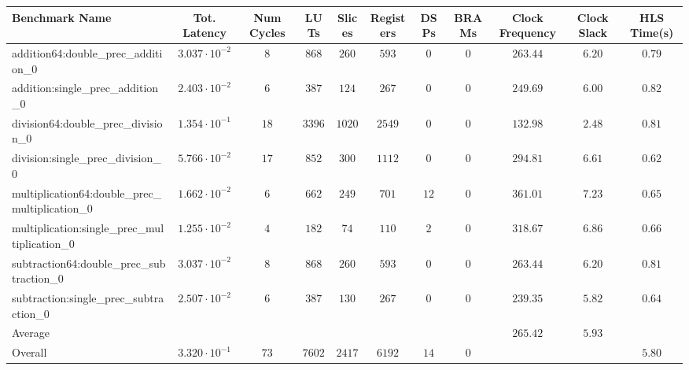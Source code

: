 \begin{tabular}{|l|c|c|c|c|c|c|c|c|c|c|}
\hline
Benchmark Name                                   & Tot. Latency            & Num Cycles & LUTs     & Slices   & Registers & DSPs   & BRAMs & Clock Frequency & Clock Slack & HLS Time(s) \\
\hline
addition64:double\_prec\_addition\_0             & $ 3.037 \cdot 10^{-2} $ & $ 8      $ & $ 868  $ & $ 260  $ & $ 593   $ & $ 0  $ & $ 0 $ & $ 263.44      $ & $ 6.20    $ & $ 0.79    $ \\
addition:single\_prec\_addition\_0               & $ 2.403 \cdot 10^{-2} $ & $ 6      $ & $ 387  $ & $ 124  $ & $ 267   $ & $ 0  $ & $ 0 $ & $ 249.69      $ & $ 6.00    $ & $ 0.82    $ \\
division64:double\_prec\_division\_0             & $ 1.354 \cdot 10^{-1} $ & $ 18     $ & $ 3396 $ & $ 1020 $ & $ 2549  $ & $ 0  $ & $ 0 $ & $ 132.98      $ & $ 2.48    $ & $ 0.81    $ \\
division:single\_prec\_division\_0               & $ 5.766 \cdot 10^{-2} $ & $ 17     $ & $ 852  $ & $ 300  $ & $ 1112  $ & $ 0  $ & $ 0 $ & $ 294.81      $ & $ 6.61    $ & $ 0.62    $ \\
multiplication64:double\_prec\_multiplication\_0 & $ 1.662 \cdot 10^{-2} $ & $ 6      $ & $ 662  $ & $ 249  $ & $ 701   $ & $ 12 $ & $ 0 $ & $ 361.01      $ & $ 7.23    $ & $ 0.65    $ \\
multiplication:single\_prec\_multiplication\_0   & $ 1.255 \cdot 10^{-2} $ & $ 4      $ & $ 182  $ & $ 74   $ & $ 110   $ & $ 2  $ & $ 0 $ & $ 318.67      $ & $ 6.86    $ & $ 0.66    $ \\
subtraction64:double\_prec\_subtraction\_0       & $ 3.037 \cdot 10^{-2} $ & $ 8      $ & $ 868  $ & $ 260  $ & $ 593   $ & $ 0  $ & $ 0 $ & $ 263.44      $ & $ 6.20    $ & $ 0.81    $ \\
subtraction:single\_prec\_subtraction\_0         & $ 2.507 \cdot 10^{-2} $ & $ 6      $ & $ 387  $ & $ 130  $ & $ 267   $ & $ 0  $ & $ 0 $ & $ 239.35      $ & $ 5.82    $ & $ 0.64    $ \\
\hline
Average                                          & $                     $ & $        $ & $      $ & $      $ & $       $ & $    $ & $   $ & $ 265.42      $ & $ 5.93    $ & $         $ \\
\hline
Overall                                          & $ 3.320 \cdot 10^{-1} $ & $ 73     $ & $ 7602 $ & $ 2417 $ & $ 6192  $ & $ 14 $ & $ 0 $ & $             $ & $         $ & $ 5.80    $ \\
\hline
\end{tabular}
